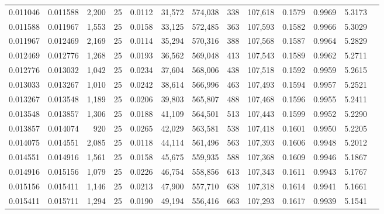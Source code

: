 \begin{tabular}{rrrrrrrrrrrrr}
0.011046 & 0.011588 & 2,200 &  25 &                                     0.0112 &  31,572 & 574,038 &     338 & 107,618 & 0.1579 & 0.9969 & 5.3173 \\
0.011588 & 0.011967 & 1,553 &  25 &                                     0.0158 &  33,125 & 572,485 &     363 & 107,593 & 0.1582 & 0.9966 & 5.3029 \\
0.011967 & 0.012469 & 2,169 &  25 &                                     0.0114 &  35,294 & 570,316 &     388 & 107,568 & 0.1587 & 0.9964 & 5.2829 \\
0.012469 & 0.012776 & 1,268 &  25 &                                     0.0193 &  36,562 & 569,048 &     413 & 107,543 & 0.1589 & 0.9962 & 5.2711 \\
0.012776 & 0.013032 & 1,042 &  25 &                                     0.0234 &  37,604 & 568,006 &     438 & 107,518 & 0.1592 & 0.9959 & 5.2615 \\
0.013033 & 0.013267 & 1,010 &  25 &                                     0.0242 &  38,614 & 566,996 &     463 & 107,493 & 0.1594 & 0.9957 & 5.2521 \\
0.013267 & 0.013548 & 1,189 &  25 &                                     0.0206 &  39,803 & 565,807 &     488 & 107,468 & 0.1596 & 0.9955 & 5.2411 \\
0.013548 & 0.013857 & 1,306 &  25 &                                     0.0188 &  41,109 & 564,501 &     513 & 107,443 & 0.1599 & 0.9952 & 5.2290 \\
0.013857 & 0.014074 &   920 &  25 &                                     0.0265 &  42,029 & 563,581 &     538 & 107,418 & 0.1601 & 0.9950 & 5.2205 \\
0.014075 & 0.014551 & 2,085 &  25 &                                     0.0118 &  44,114 & 561,496 &     563 & 107,393 & 0.1606 & 0.9948 & 5.2012 \\
0.014551 & 0.014916 & 1,561 &  25 &                                     0.0158 &  45,675 & 559,935 &     588 & 107,368 & 0.1609 & 0.9946 & 5.1867 \\
0.014916 & 0.015156 & 1,079 &  25 &                                     0.0226 &  46,754 & 558,856 &     613 & 107,343 & 0.1611 & 0.9943 & 5.1767 \\
0.015156 & 0.015411 & 1,146 &  25 &                                     0.0213 &  47,900 & 557,710 &     638 & 107,318 & 0.1614 & 0.9941 & 5.1661 \\
0.015411 & 0.015711 & 1,294 &  25 &                                     0.0190 &  49,194 & 556,416 &     663 & 107,293 & 0.1617 & 0.9939 & 5.1541 \\

\end{tabular}
